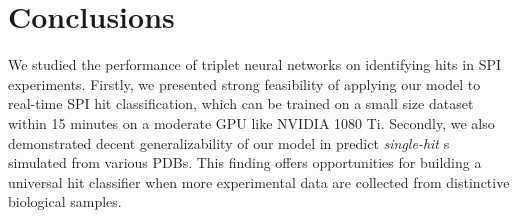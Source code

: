 



















\section{Conclusions}

We studied the performance of triplet neural networks on identifying hits in SPI
experiments.  Firstly, we presented strong feasibility of applying our model to
real-time SPI hit classification, which can be trained on a small size dataset
within 15 minutes on a moderate GPU like NVIDIA 1080 Ti.  Secondly, we also
demonstrated decent generalizability of our model in predict \textit{single-hit}
s simulated from various PDBs.  This finding offers opportunities for building a
universal hit classifier when more experimental data are collected from
distinctive biological samples.

